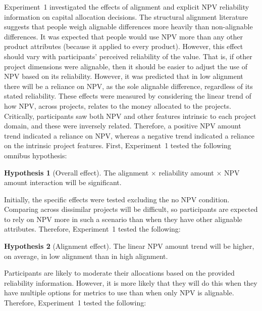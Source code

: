 \documentclass[a4paper, nobind, dvipsnames]{templates/ociamthesis}
\theoremstyle{definition}
\theoremstyle{definition}
\theoremstyle{definition}
\theoremstyle{definition}
\newtheorem{hypothesis}{Hypothesis}[chapter]
\theoremstyle{remark}
\begin{document}
Experiment~1 investigated the effects of alignment and explicit NPV reliability
information on capital allocation decisions. The structural alignment literature
suggests that people weigh alignable differences more heavily than non-alignable
differences. It was expected that people would use NPV more than any other
product attributes (because it applied to every product). However, this effect
should vary with participants' perceived reliability of the value. That is, if
other project dimensions were alignable, then it should be easier to adjust the
use of NPV based on its reliability. However, it was predicted that in low
alignment there will be a reliance on NPV, as the sole alignable difference,
regardless of its stated reliability. These effects were measured by considering
the linear trend of how NPV, across projects, relates to the money allocated to
the projects. Critically, participants saw both NPV and other features intrinsic
to each project domain, and these were inversely related. Therefore, a positive
NPV amount trend indicated a reliance on NPV, whereas a negative trend indicated
a reliance on the intrinsic project features. First, Experiment~1 tested the
following omnibus hypothesis:

\begin{hypothesis}[Overall effect]
\protect\hypertarget{hyp:three-way-alignment-2}{}{\label{hyp:three-way-alignment-2} {} }The alignment \(\times\) reliability amount \(\times\) NPV amount interaction will
be significant.
\end{hypothesis}

Initially, the specific effects were tested excluding the no NPV condition.
Comparing across dissimilar projects will be difficult, so participants are
expected to rely on NPV more in such a scenario than when they have other
alignable attributes. Therefore, Experiment~1 tested the following:

\begin{hypothesis}[Alignment effect]
\protect\hypertarget{hyp:allocation-alignment-alignment-2}{}{\label{hyp:allocation-alignment-alignment-2} {} }The linear NPV amount trend will be higher, on average, in low alignment
than in high alignment.
\end{hypothesis}

Participants are likely to moderate their allocations based on the provided
reliability information. However, it is more likely that they will do this when
they have multiple options for metrics to use than when only NPV is
alignable. Therefore, Experiment~1 tested the following:
\end{document}
